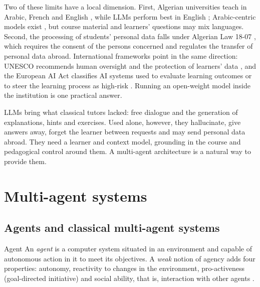 Two of these limits have a local dimension. First, Algerian universities
teach in Arabic, French and English \cite{benrabah2013}, while LLMs perform
best in English \cite{lai2023}; Arabic-centric models exist
\cite{sengupta2023jais}, but course material and learners' questions may
mix languages. Second, the processing of students' personal data falls
under Algerian Law 18-07 \cite{algeria_law1807}, which requires the
consent of the persons concerned and regulates the transfer of personal
data abroad. International frameworks point in the same direction: UNESCO
recommends human oversight and the protection of learners' data
\cite{unesco2023}, and the European AI Act classifies AI systems used to
evaluate learning outcomes or to steer the learning process as high-risk
\cite{euaiact2024}. Running an open-weight model inside the institution is
one practical answer.

\begin{summarybox}[Takeaway]
LLMs bring what classical tutors lacked: free dialogue and the generation
of explanations, hints and exercises. Used alone, however, they
hallucinate, give answers away, forget the learner between requests and
may send personal data abroad. They need a learner and context model,
grounding in the course and pedagogical control around them. A
multi-agent architecture is a natural way to provide them.
\end{summarybox}

\section{Multi-agent systems}
\label{sec-mas}

\subsection{Agents and classical multi-agent systems}
\label{subsec-classical-mas}

\begin{definitionbox}{Agent}
An \emph{agent} is a computer system situated in an environment and
capable of autonomous action in it to meet its objectives. A
\emph{weak} notion of agency adds four properties: autonomy, reactivity to
changes in the environment, pro-activeness (goal-directed initiative) and
social ability, that is, interaction with other agents
\cite{wooldridge1995}.
\end{definitionbox}

